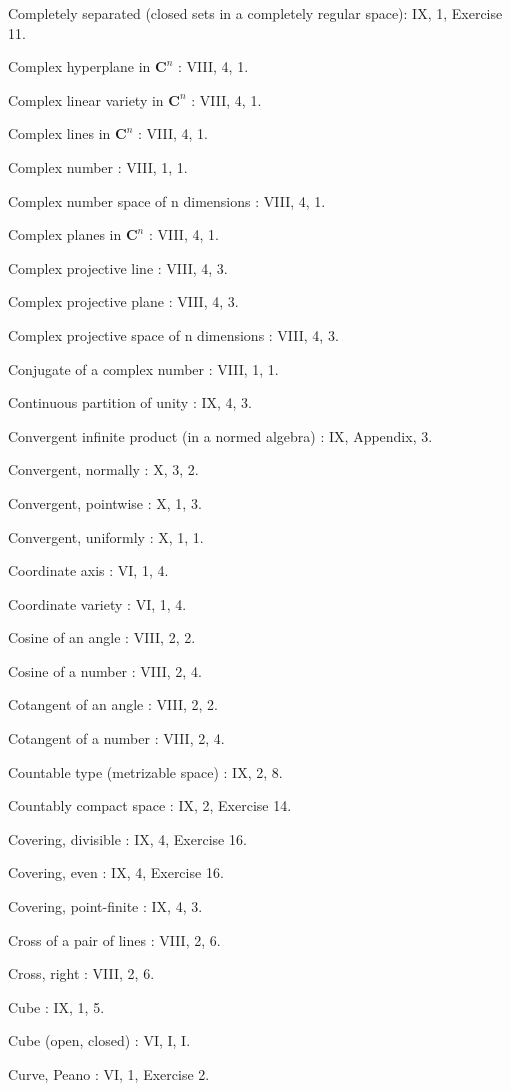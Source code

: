 Completely separated (closed sets in a completely regular space): IX, 1, Exercise 11.

Complex hyperplane in \(\mathbf{C}^n\) : VIII, 4, 1.

Complex linear variety in \(\mathbf{C}^n\) : VIII, 4, 1.

Complex lines in \(\mathbf{C}^n\) : VIII, 4, 1.

Complex number : VIII, 1, 1.

Complex number space of n dimensions : VIII, 4, 1.

Complex planes in \(\mathbf{C}^n\) : VIII, 4, 1.

Complex projective line : VIII, 4, 3.

Complex projective plane : VIII, 4, 3.

Complex projective space of n dimensions : VIII, 4, 3.

Conjugate of a complex number : VIII, 1, 1.

Continuous partition of unity : IX, 4, 3.

Convergent infinite product (in a normed algebra) : IX, Appendix, 3.

Convergent, normally : X, 3, 2.

Convergent, pointwise : X, 1, 3.

Convergent, uniformly : X, 1, 1.

Coordinate axis : VI, 1, 4.

Coordinate variety : VI, 1, 4.

Cosine of an angle : VIII, 2, 2.

Cosine of a number : VIII, 2, 4.

Cotangent of an angle : VIII, 2, 2.

Cotangent of a number : VIII, 2, 4.

Countable type (metrizable space) : IX, 2, 8.

Countably compact space : IX, 2, Exercise 14.

Covering, divisible : IX, 4, Exercise 16.

Covering, even : IX, 4, Exercise 16.

Covering, point-finite : IX, 4, 3.

Cross of a pair of lines : VIII, 2, 6.

Cross, right : VIII, 2, 6.

Cube : IX, 1, 5.

Cube (open, closed) : VI, I, I.

Curve, Peano : VI, 1, Exercise 2.


